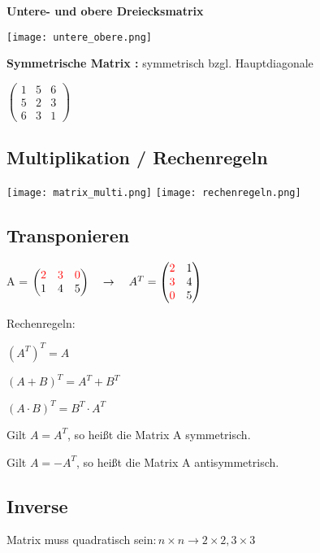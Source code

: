 \begin{multicols*}{3}
    \textbf{Untere- und obere Dreiecksmatrix}

    \texttt{[image: untere\_obere.png]}

    \textbf{Symmetrische Matrix :} symmetrisch bzgl. Hauptdiagonale

    $ \begin{pmatrix}
            1 & 5 & 6 \\
            5 & 2 & 3 \\
            6 & 3 & 1
        \end{pmatrix} $

    \WhiteSpace
    \subsection{Multiplikation / Rechenregeln}
    {\begin{multicols}{2}
            { \texttt{[image: matrix\_multi.png]} }
            \columnbreak
            { \texttt{[image: rechenregeln.png]} }
        \end{multicols}}

    \subsection{Transponieren}

    A = $\begin{pmatrix} {\color{red}2} & {\color{red}3} & {\color{red}0} \\ 1 & 4 & 5 \end{pmatrix} \quad
        \rightarrow
        \quad A^{T} = \begin{pmatrix} {\color{red}2} & 1 \\ {\color{red}3} & 4 \\ {\color{red}0} & 5 \end{pmatrix}
    $

    {Rechenregeln:}

    $ \left(A^{T}\right)^{T} = A $

    $ \left(A + B\right)^{T} = A^{T} + B^{T} $

    $ \left(A \cdot B\right)^{T} = B^{T} \cdot A^{T} $

    {Gilt $ A = A^{T} $, so heißt die Matrix A symmetrisch.}


    {Gilt $ A = -A^{T} $, so heißt die Matrix A antisymmetrisch.}

    \subsection{Inverse}
    {Matrix muss quadratisch sein$: n \times n \rightarrow 2\times2, 3\times3$}


\end{multicols*}
